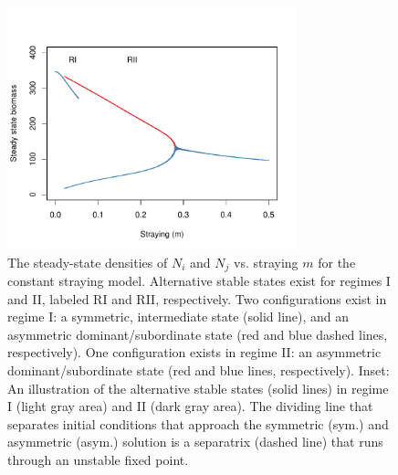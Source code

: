 \documentclass{revtex4}
\begin{document}

\clearpage


\begin{figure}
  \captionsetup{justification=raggedright,
singlelinecheck=false
}
\centering
\includegraphics[width=0.75\textwidth]{fig_traj.pdf}
\caption{
The steady-state densities of $N_i$ and $N_j$ vs. straying $m$ for the constant straying model. 
Alternative stable states exist for regimes I and II, labeled RI and RII, respectively.
Two configurations exist in regime I: a symmetric, intermediate state (solid line), and an asymmetric dominant/subordinate state (red and blue dashed lines, respectively).
One configuration exists in regime II: an asymmetric dominant/subordinate state (red and blue lines, respectively).
Inset: An illustration of the alternative stable states (solid lines) in regime I (light gray area) and II (dark gray area).
The dividing line that separates initial conditions that approach the symmetric (sym.) and asymmetric (asym.) solution is a separatrix (dashed line) that runs through an unstable fixed point.
} \label{fig:traj}
\end{figure}
\end{document}
